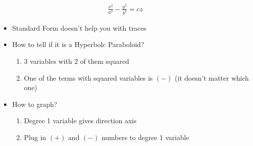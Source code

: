 \documentclass{article}
\begin{document}
\begin{align}
  \frac{x^2}{a^2} - \frac{y^2}{b^2} = cz
\end{align}
\begin{itemize}
  \item Standard Form doesn't help you with traces
  \item How to tell if it is a Hyperbolc Paraboloid?
  \begin{enumerate}
    \item 3 variables with 2 of them squared
    \item One of the terms with squared variables is $(-)$ (it doesn't matter which one)
  \end{enumerate}
  \item How to graph?
  \begin{enumerate}
    \item Degree 1 variable gives direction axis
    \item Plug in $(+)$ and $(-)$ numbers to degree 1 variable
  \end{enumerate}
\end{itemize}
\end{document}
